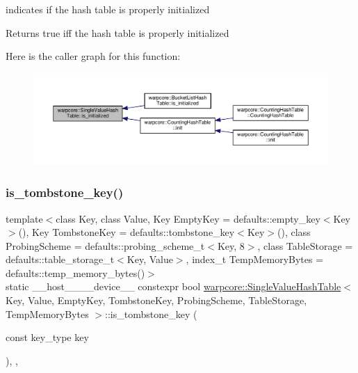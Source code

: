 indicates if the hash table is properly initialized 

\begin{DoxyReturn}{Returns}
{\ttfamily true} iff the hash table is properly initialized 
\end{DoxyReturn}
Here is the caller graph for this function\+:
\nopagebreak
\begin{figure}[H]
\begin{center}
\leavevmode
\includegraphics[width=350pt]{classwarpcore_1_1SingleValueHashTable_ae366b3fd0d7edbac68a939fe580df9a4_icgraph}
\end{center}
\end{figure}
\mbox{\label{classwarpcore_1_1SingleValueHashTable_a38a217e5b08eeab46539501b1cd2a082}} 
\subsubsection{\texorpdfstring{is\+\_\+tombstone\+\_\+key()}{is\_tombstone\_key()}}
{\footnotesize\ttfamily template$<$class Key, class Value, Key Empty\+Key = defaults\+::empty\+\_\+key$<$\+Key$>$(), Key Tombstone\+Key = defaults\+::tombstone\+\_\+key$<$\+Key$>$(), class Probing\+Scheme = defaults\+::probing\+\_\+scheme\+\_\+t$<$\+Key, 8$>$, class Table\+Storage = defaults\+::table\+\_\+storage\+\_\+t$<$\+Key, Value$>$, index\+\_\+t Temp\+Memory\+Bytes = defaults\+::temp\+\_\+memory\+\_\+bytes()$>$ \\
static \+\_\+\+\_\+host\+\_\+\+\_\+\+\_\+\+\_\+device\+\_\+\+\_\+ constexpr bool \hyperlink{classwarpcore_1_1SingleValueHashTable}{warpcore\+::\+Single\+Value\+Hash\+Table}$<$ Key, Value, Empty\+Key, Tombstone\+Key, Probing\+Scheme, Table\+Storage, Temp\+Memory\+Bytes $>$\+::is\+\_\+tombstone\+\_\+key (\begin{DoxyParamCaption}\item[{const key\+\_\+type}]{key }\end{DoxyParamCaption})\hspace{0.3cm}{\ttfamily [inline]}, {\ttfamily [static]}, {\ttfamily [noexcept]}}



